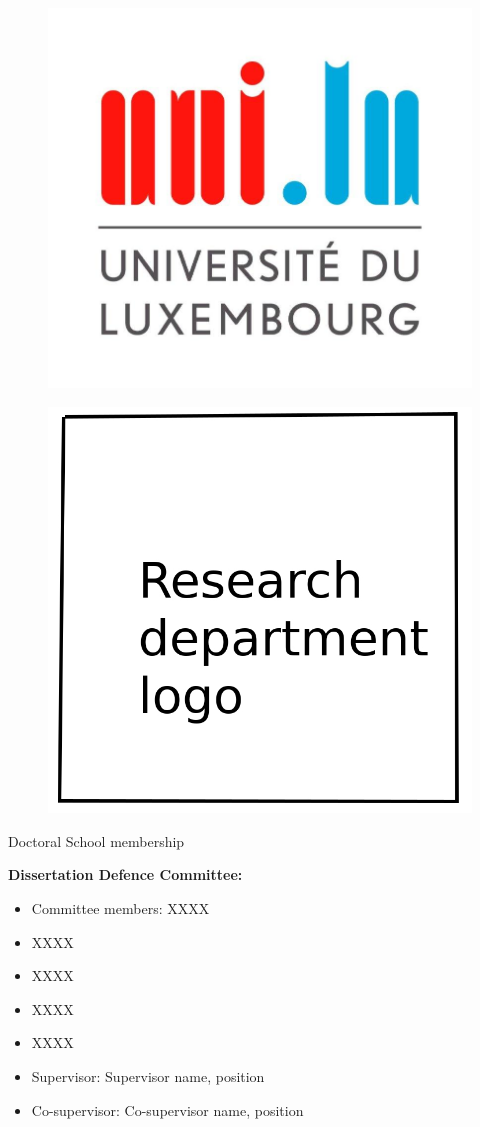 \documentclass[11pt,a4paper]{report}
\begin{document}
\newpage
\thispagestyle{empty}


\begin{figure}
\includegraphics[width=0.3\columnwidth]{logo_uni.jpg}
\centering
\end{figure}

\begin{figure}
\includegraphics[width=0.3\columnwidth]{research_department_logo.jpg}
\centering
\end{figure}
\vfill
\begin{center}
Doctoral School membership\\
\end{center}


\vfill
\noindent \textbf{Dissertation Defence Committee:}
\vspace{0.2cm}
\begin{itemize}[leftmargin=0cm]
\item[] Committee members: \hspace{2cm} XXXX
	\item[] \hspace{5.8cm} XXXX
	\item[] \hspace{5.8cm} XXXX
	\item[] \hspace{5.8cm} XXXX
	\item[] \hspace{5.8cm} XXXX
\end{itemize}
\begin{itemize}[leftmargin=0cm]
	\item[] Supervisor: \hspace{3.6cm} Supervisor name, position
\end{itemize}
\begin{itemize}[leftmargin=0cm]
	\item[] Co-supervisor: \hspace{3.1cm} Co-supervisor name, position
\end{itemize}
\end{document}
